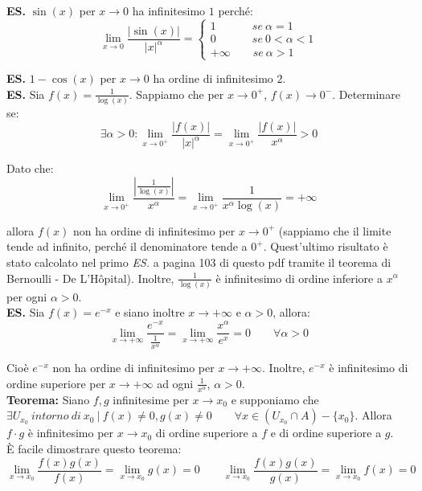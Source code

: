 \documentclass{article}
\begin{document}
\noindent\textbf{ES.} $\sin(x)$ per $x \to 0$ ha infinitesimo $1$ perché:
\begin{equation*}
    \lim_{x \to 0} \frac{|\sin(x)|}{|x|^\alpha} = \begin{cases}
        1 \qquad \quad \ se \ \alpha = 1\\
        0 \qquad \quad \ se \ 0 < \alpha < 1\\
        +\infty \qquad se \ \alpha > 1
    \end{cases}
\end{equation*}

\noindent\textbf{ES.} $1 - \cos(x)$ per $x \to 0$ ha ordine di infinitesimo $2$.\\

\noindent\textbf{ES.} Sia $f(x) = \frac{1}{\log(x)}$. Sappiamo che per $x \to 0^+$, $f(x) \to 0^-$. Determinare se:
\begin{equation*}
    \exists \alpha > 0 : \lim_{x \to 0^+} \frac{|f(x)|}{|x|^\alpha} = \lim_{x \to 0^+} \frac{|f(x)|}{x^\alpha} > 0
\end{equation*}

\noindent Dato che:
\begin{equation*}
    \lim_{x \to 0^+} \frac{|\frac{1}{\log(x)}|}{x^\alpha} = \lim_{x \to 0^+} \frac{1}{x^\alpha\log(x)} = +\infty
\end{equation*}

\noindent allora $f(x)$ non ha ordine di infinitesimo per $x \to 0^+$ (sappiamo che il limite tende ad infinito, perché il denominatore tende a $0^+$. Quest'ultimo risultato è stato calcolato nel primo \textit{ES.} a pagina 103 di questo pdf tramite il teorema di Bernoulli - De L'Hôpital). Inoltre, $\frac{1}{\log(x)}$ è infinitesimo di ordine inferiore a $x^\alpha$ per ogni $\alpha > 0$.\\

\noindent\textbf{ES.} Sia $f(x) = e^{-x}$ e siano inoltre $x \to +\infty$ e $\alpha > 0$, allora:
\begin{equation*}
    \lim_{x \to +\infty} \frac{e^{-x}}{\frac{1}{x^\alpha}} = \lim_{x \to +\infty} \frac{x^\alpha}{e^x} = 0 \qquad \forall \alpha > 0
\end{equation*}

\noindent Cioè $e^{-x}$ non ha ordine di infinitesimo per $x \to +\infty$. Inoltre, $e^{-x}$ è infinitesimo di ordine superiore per $x \to +\infty$ ad ogni $\frac{1}{x^\alpha}$, $\alpha > 0$.\\

\noindent\textbf{Teorema:} Siano $f, g$ infinitesime per $x \to x_0$ e supponiamo che $\exists U_{x_0} \ intorno \ di \ x_0 \ | \ f(x) \neq 0, g(x) \neq 0 \qquad \forall x \in (U_{x_0} \cap A) - \{x_0\}$. Allora $f \cdot g$ è infinitesimo per $x \to x_0$ di ordine superiore a $f$ e di ordine superiore a $g$. \\
È facile dimostrare questo teorema:
\begin{equation*}
    \lim_{x \to x_0} \frac{f(x)g(x)}{f(x)} = \lim_{x \to x_0} g(x) = 0 \qquad \lim_{x \to x_0} \frac{f(x)g(x)}{g(x)} = \lim_{x \to x_0} f(x) = 0 
\end{equation*}
\end{document}
